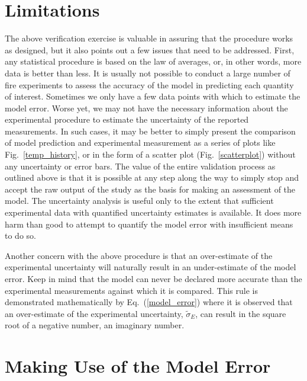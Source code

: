 \section{Limitations}

The above verification exercise is valuable in assuring that the procedure works as designed, but it also points out a few issues that need to be addressed. First, any
statistical procedure is based on the law of averages, or, in other words, more data is better than less. It is usually not possible to conduct a large number of
fire experiments
to assess the accuracy of the model in predicting each quantity of interest. Sometimes we only have a few data points with which to estimate the model error. Worse yet,
we may not have the necessary information about the experimental procedure to estimate the uncertainty of the reported measurements. In such cases, it may be better
to simply present the comparison of model prediction and experimental measurement as a series of plots like Fig.~\ref{temp_history}, or in the form of a scatter plot
(Fig.~\ref{scatterplot}) without any uncertainty or error bars. The value of the entire validation process as outlined above is that it is possible at any step
along the way to simply stop and accept the raw output of the study as the basis for making an assessment of the model. The uncertainty analysis is useful only to
the extent that sufficient experimental data with quantified uncertainty estimates is available. It does more harm than good to attempt to quantify the model error
with insufficient means to do so.

Another concern with the above procedure is that an over-estimate of the experimental uncertainty will naturally result in an under-estimate of the model error. Keep
in mind that the model can never be declared more accurate than the experimental measurements against which it is compared. This rule is demonstrated
mathematically by Eq.~(\ref{model_error}) where it is observed that an over-estimate of the experimental uncertainty, $\tilde{\sigma}_E$, can result in
the square root of a negative number, an imaginary number.

\section{Making Use of the Model Error}

